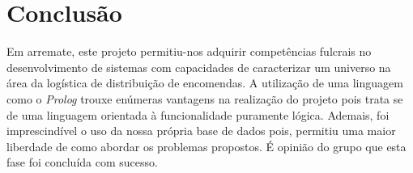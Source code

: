 \documentclass[a4paper,12pt]{article}
\begin{document}
    \section{Conclusão}
	    Em arremate, este projeto permitiu-nos adquirir competências fulcrais no desenvolvimento de sistemas com capacidades de caracterizar um universo na área da logística de distribuição de encomendas. A utilização de uma linguagem como o \emph{Prolog} trouxe enúmeras vantagens na realização do projeto pois trata se de uma linguagem orientada à funcionalidade puramente lógica. Ademais, foi imprescindível o uso da nossa própria base de dados pois, permitiu uma maior liberdade de como abordar os problemas propostos. É opinião do grupo que esta fase foi concluída com sucesso.\par
    
    
    \newpage
    
\end{document}
